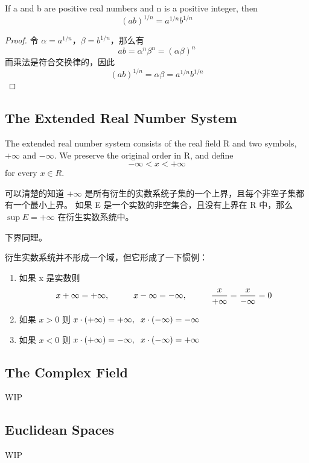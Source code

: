 \documentclass[../poma-note.tex]{subfiles}
\begin{document}
\begin{corollary}
	If a and b are positive real numbers and n is a positive integer, then
	\[(ab)^{1/n} = a^{1/n}b^{1/n}\]
\end{corollary}

\begin{proof}
	令 $\alpha = a^{1/n}$，$\beta = b^{1/n}$，那么有
	\[ab = \alpha^n \beta^n = (\alpha\beta)^n\]
	而乘法是符合交换律的，因此
	\[(ab)^{1/n} = \alpha\beta = a^{1/n}b^{1/n}\]
\end{proof}

\subsection*{The Extended Real Number System}

\begin{definition}
	The extended real number system consists of the real field R and two symbols, $+\infty$ and $-\infty$.
	We preserve the original order in R, and define
	\[-\infty < x < +\infty\]
	for every $x \in R$.
\end{definition}

可以清楚的知道 $+\infty$ 是所有衍生的实数系统子集的一个上界，且每个非空子集都有一个最小上界。
如果 E 是一个实数的非空集合，且没有上界在 R 中，那么 $\sup E = + \infty$ 在衍生实数系统中。

下界同理。

衍生实数系统并不形成一个域，但它形成了一下惯例：

\begin{enumerate}[label=(\alph*)]
	\item 如果 x 是实数则
	      \[x+\infty=+\infty,\atab x-\infty=-\infty,\atab \frac{x}{+\infty}=\frac{x}{-\infty}=0\]
	\item 如果 $x>0$ 则 $x \cdot (+\infty) = +\infty,\atab[2mm] x \cdot (-\infty) = -\infty$
	\item 如果 $x<0$ 则 $x \cdot (+\infty) = -\infty,\atab[2mm] x \cdot (-\infty) = +\infty$
\end{enumerate}

\subsection*{The Complex Field}

WIP

\subsection*{Euclidean Spaces}

WIP
\end{document}
